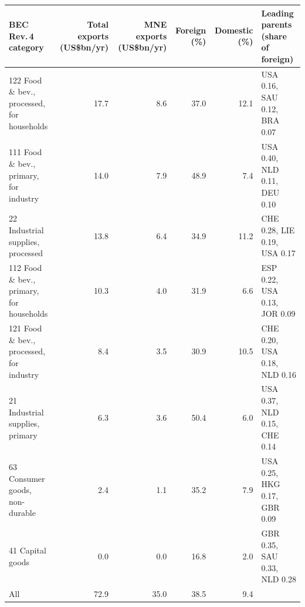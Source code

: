 \begin{tabular}{@{}l r r r r l@{}}
\toprule
BEC Rev.\,4 category & Total exports (US\$bn/yr) & MNE exports (US\$bn/yr) & Foreign (\%) & Domestic (\%) & Leading parents (share of foreign) \\
\midrule
122 Food \& bev., processed, for households & 17.7 & 8.6 & 37.0 & 12.1 & USA 0.16, SAU 0.12, BRA 0.07 \\
111 Food \& bev., primary, for industry & 14.0 & 7.9 & 48.9 & 7.4 & USA 0.40, NLD 0.11, DEU 0.10 \\
22 Industrial supplies, processed & 13.8 & 6.4 & 34.9 & 11.2 & CHE 0.28, LIE 0.19, USA 0.17 \\
112 Food \& bev., primary, for households & 10.3 & 4.0 & 31.9 & 6.6 & ESP 0.22, USA 0.13, JOR 0.09 \\
121 Food \& bev., processed, for industry & 8.4 & 3.5 & 30.9 & 10.5 & CHE 0.20, USA 0.18, NLD 0.16 \\
21 Industrial supplies, primary & 6.3 & 3.6 & 50.4 & 6.0 & USA 0.37, NLD 0.15, CHE 0.14 \\
63 Consumer goods, non-durable & 2.4 & 1.1 & 35.2 & 7.9 & USA 0.25, HKG 0.17, GBR 0.09 \\
41 Capital goods & 0.0 & 0.0 & 16.8 & 2.0 & GBR 0.35, SAU 0.33, NLD 0.28 \\
\midrule
All & 72.9 & 35.0 & 38.5 & 9.4 & \\
\bottomrule
\end{tabular}

